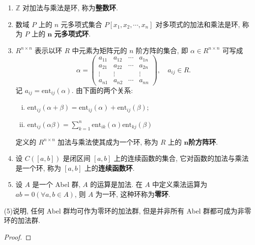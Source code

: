 \documentclass[../../main.tex]{subfiles}%
\begin{document}
\begin{example}
\begin{enumerate}[(1)]
\item \( \mathbb{Z} \) 对加法与乘法是环, 称为\textbf{整数环}.

\item 数域 \( P \) 上的 \( n \) 元多项式集合 \( P[x_1,x_2,\cdots,x_n] \) 对多项式的加法和乘法是环, 称为 \( P \) 上的 \( \boldsymbol{n} \) \textbf{元多项式环}. 

\item \( R^{n \times n} \) 表示以环 \( R \) 中元素为矩阵元的 \( n \) 阶方阵的集合, 即 \( \alpha \in R^{n \times n} \) 可写成
\[
\alpha = \begin{pmatrix}
a_{11} & a_{12} & \cdots & a_{1n} \\
a_{21} & a_{22} & \cdots & a_{2n} \\
\vdots & \vdots & & \vdots \\
a_{n1} & a_{n2} & \cdots & a_{nn}
\end{pmatrix}, \quad a_{ij} \in R.
\]
记 \( a_{ij} = \text{ent}_{ij}(\alpha) \). 由下面的两个关系:
\begin{enumerate}[(i)]
\item \( \text{ent}_{ij}(\alpha + \beta) = \text{ent}_{ij}(\alpha) + \text{ent}_{ij}(\beta) \);
\item \( \text{ent}_{ij}(\alpha\beta) = \sum_{k=1}^n \text{ent}_{ik}(\alpha)\text{ent}_{kj}(\beta) \)
\end{enumerate}
定义的 \( R^{n \times n} \) 加法与乘法使其成为一个环, 称为 \( R \) 上的 \(\boldsymbol{n}\)\textbf{阶方阵环}.

\item 设 \( C([a,b]) \) 是闭区间 \([a,b]\) 上的连续函数的集合, 它对函数的加法与乘法是一个环, 称为 \([a,b]\) 上的\textbf{连续函数环}.

\item 设 \( A \) 是一个 Abel 群, \( A \) 的运算是加法. 在 \( A \) 中定义乘法运算为 \( ab = 0 (\forall a,b \in A) \), 则 \( A \) 为一环, 这种环称为\textbf{零环}.
\end{enumerate}
\end{example}
\begin{remark}
(5)说明, 任何 Abel 群均可作为零环的加法群, 但是并非所有 Abel 群都可成为非零环的加法群.
\end{remark}
\begin{proof}



\end{proof}
\end{document}
